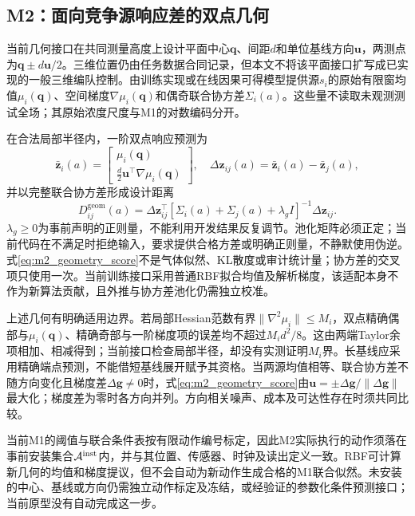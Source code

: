 \subsection{M2：面向竞争源响应差的双点几何}

当前几何接口在共同测量高度上设计平面中心$\mathbf q$、间距$d$和单位基线方向$\mathbf u$，两测点为$\mathbf q\pm d\mathbf u/2$。三维位置仍由任务数据合同记录，但本文不将该平面接口扩写成已实现的一般三维编队控制。由训练实现或在线因果可得模型提供源$s_i$的原始有限窗均值$\mu_i(\mathbf q)$、空间梯度$\nabla\mu_i(\mathbf q)$和偶奇联合协方差$\Sigma_i(a)$。这些量不读取未观测测试全场；其原始浓度尺度与M1的对数编码分开。

在合法局部半径内，一阶双点响应预测为
\begin{equation}
\bar{\mathbf z}_i(a)=
\begin{bmatrix}\mu_i(\mathbf q)\\
\frac d2\mathbf u^\top\nabla\mu_i(\mathbf q)\end{bmatrix},
\quad
\Delta\mathbf z_{ij}(a)=\bar{\mathbf z}_i(a)-\bar{\mathbf z}_j(a),
\label{eq:m2_response}
\end{equation}
并以完整联合协方差形成设计距离
\begin{equation}
D_{ij}^{\mathrm{geom}}(a)=
\Delta\mathbf z_{ij}^{\top}
[\Sigma_i(a)+\Sigma_j(a)+\lambda_gI]^{-1}
\Delta\mathbf z_{ij}.
\label{eq:m2_geometry_score}
\end{equation}
$\lambda_g\ge0$为事前声明的正则量，不能利用开发结果反复调节。池化矩阵必须正定；当前代码在不满足时拒绝输入，要求提供合格方差或明确正则量，不静默使用伪逆。式\eqref{eq:m2_geometry_score}不是气体似然、KL散度或审计统计量；协方差的交叉项只使用一次。当前训练接口采用普通RBF拟合均值及解析梯度，该适配本身不作为新算法贡献，且外推与协方差池化仍需独立校准。

上述几何有明确适用边界。若局部Hessian范数有界$\|\nabla^2\mu_i\|\le M_i$，双点精确偶部与$\mu_i(\mathbf q)$、精确奇部与一阶梯度项的误差均不超过$M_id^2/8$。这由两端Taylor余项相加、相减得到；当前接口检查局部半径，却没有实测证明$M_i$界。长基线应采用精确端点预测，不能借短基线展开赋予其资格。当两源均值相等、联合协方差不随方向变化且梯度差$\Delta\mathbf g\ne0$时，式\eqref{eq:m2_geometry_score}由$\mathbf u=\pm\Delta\mathbf g/\|\Delta\mathbf g\|$最大化；梯度差为零时各方向并列。方向相关噪声、成本及可达性存在时须共同比较。

当前M1的阈值与联合条件表按有限动作编号标定，因此M2实际执行的动作须落在事前安装集合$\mathcal A^{\rm inst}$内，并与其位置、传感器、时钟及读出定义一致。RBF可计算新几何的均值和梯度提议，但不会自动为新动作生成合格的M1联合似然。未安装的中心、基线或方向仍需独立动作标定及冻结，或经验证的参数化条件预测接口；当前原型没有自动完成这一步。

